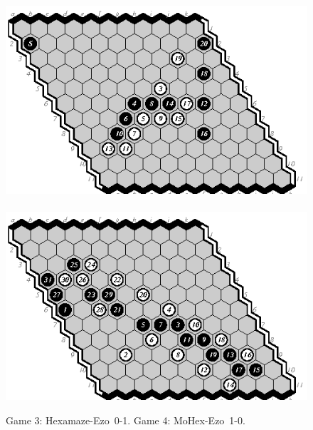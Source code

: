 \documentclass{icga}
\def\Eo{\mbox{\sc Ezo}}
\def\Hz{\mbox{\sc Hexamaze}}
\def\Mx{\mbox{\sc MoHex}}
\begin{document}
\begin{figure}[hbp]
\includegraphics[scale=1.3]{games/pix/03-he-0-1.eps}\hspace*{-1cm}\
\includegraphics[scale=1.3]{games/pix/04-me-1-0.eps}
\caption{Game 3: \Hz-\Eo\ 0-1. Game 4: \Mx-\Eo\ 1-0.}
\end{figure}
\end{document}
